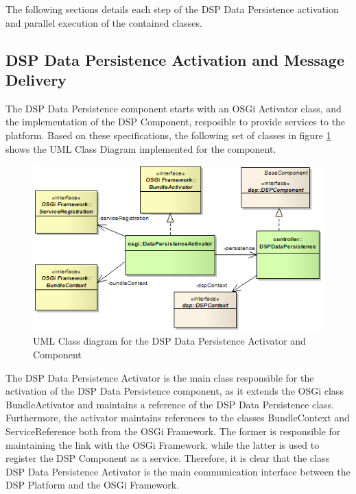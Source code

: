 The following sections details each step of the DSP Data Persistence activation
and parallel execution of the contained classes.

\subsection{DSP Data Persistence Activation and Message Delivery}

The DSP Data Persistence component starts with an OSGi Activator class, and the
implementation of the DSP Component, resposible to provide services to the
platform. Based on these specifications, the following set of classes in
figure \ref{fig:DSP-DataPersistence-Activator-Class-Diagram} shows the UML
Class Diagram implemented for the component.

\begin{figure}[!h]
  \centering
  \includegraphics[scale=0.5]{../diagrams/DSP-DataPersistence-Activator-Class-Diagram}
  \caption{UML Class diagram for the DSP Data Persistence Activator and Component}
  \label{fig:DSP-DataPersistence-Activator-Class-Diagram}
\end{figure}

The DSP Data Persistence Activator is the main class responsible for the
activation of the DSP Data Persistence component, as it extends the OSGi class
BundleActivator and maintains a reference of the DSP Data Persistence class.
Furthermore, the activator maintains references to the classes BundleContext
and ServiceReference both from the OSGi Framework. The former is responsible
for maintaining the link with the OSGi Framework, while the latter is used to
register the DSP Component as a service. Therefore, it is clear that the class
DSP Data Persistence Activator is the main communication interface between the
DSP Platform and the OSGi Framework.

